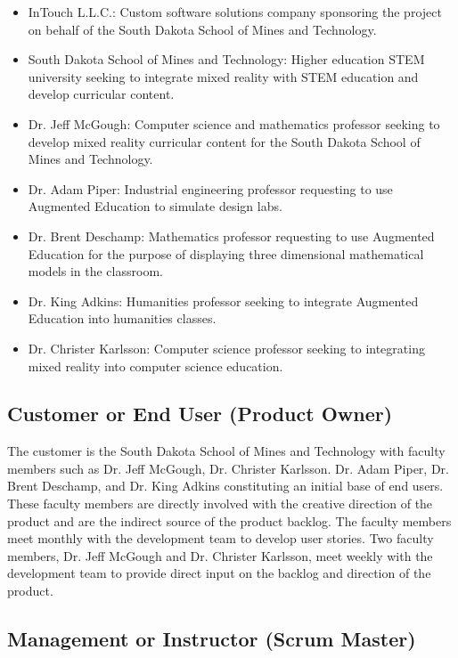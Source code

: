 \begin{itemize}
	\item InTouch L.L.C.: Custom software solutions company sponsoring the project on behalf of the South Dakota School of Mines and Technology. 
	\item South Dakota School of Mines and Technology: Higher education STEM university seeking to integrate mixed reality with STEM education and develop curricular content.
	\item Dr. Jeff McGough: Computer science and mathematics professor seeking to develop mixed reality curricular content for the South Dakota School of Mines and Technology. 
	\item Dr. Adam Piper: Industrial engineering professor requesting to use Augmented Education to simulate design labs.
	\item Dr. Brent Deschamp: Mathematics professor requesting to use Augmented Education for the purpose of displaying three dimensional mathematical models in the classroom. 
	\item Dr. King Adkins: Humanities professor seeking to integrate Augmented Education into humanities classes. 
	\item Dr. Christer Karlsson: Computer science professor seeking to integrating mixed reality into computer science education.
\end{itemize}


\subsection{Customer or End User (Product Owner)}

The customer is the South Dakota School of Mines and Technology with faculty members such as Dr. Jeff McGough, Dr. Christer Karlsson. Dr. Adam Piper, Dr. Brent Deschamp, and Dr. King Adkins constituting an initial base of end users. These faculty members are directly involved with the creative direction of the product and are the indirect source of the product backlog. The faculty members meet monthly with the development team to develop user stories. Two faculty members, Dr. Jeff McGough and Dr. Christer Karlsson, meet weekly with the development team to provide direct input on the backlog and direction of the product. 

\subsection{Management or Instructor (Scrum Master)}

